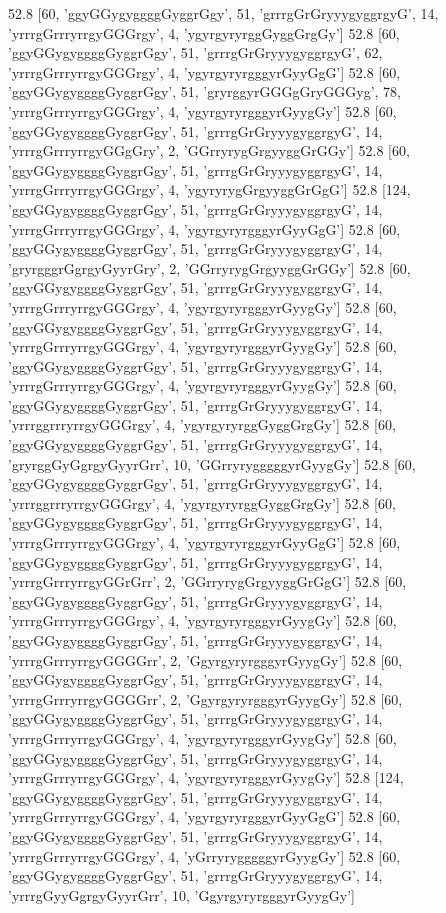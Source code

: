 52.8 [60, 'ggyGGygyggggGyggrGgy', 51, 'grrrgGrGryyygyggrgyG', 14, 'yrrrgGrrryrrgyGGGrgy', 4, 'ygyrgyryrggGyggGrgGy']
52.8 [60, 'ggyGGygyggggGyggrGgy', 51, 'grrrgGrGryyygyggrgyG', 62, 'yrrrgGrrryrrgyGGGrgy', 4, 'ygyrgyryrgggyrGyyGgG']
52.8 [60, 'ggyGGygyggggGyggrGgy', 51, 'gryrggyrGGGgGryGGGyg', 78, 'yrrrgGrrryrrgyGGGrgy', 4, 'ygyrgyryrgggyrGyygGy']
52.8 [60, 'ggyGGygyggggGyggrGgy', 51, 'grrrgGrGryyygyggrgyG', 14, 'yrrrgGrrryrrgyGGgGry', 2, 'GGrryrygGrgyyggGrGGy']
52.8 [60, 'ggyGGygyggggGyggrGgy', 51, 'grrrgGrGryyygyggrgyG', 14, 'yrrrgGrrryrrgyGGGrgy', 4, 'ygyryrygGrgyyggGrGgG']
52.8 [124, 'ggyGGygyggggGyggrGgy', 51, 'grrrgGrGryyygyggrgyG', 14, 'yrrrgGrrryrrgyGGGrgy', 4, 'ygyrgyryrgggyrGyyGgG']
52.8 [60, 'ggyGGygyggggGyggrGgy', 51, 'grrrgGrGryyygyggrgyG', 14, 'gryrgggrGgrgyGyyrGry', 2, 'GGrryrygGrgyyggGrGGy']
52.8 [60, 'ggyGGygyggggGyggrGgy', 51, 'grrrgGrGryyygyggrgyG', 14, 'yrrrgGrrryrrgyGGGrgy', 4, 'ygyrgyryrgggyrGyygGy']
52.8 [60, 'ggyGGygyggggGyggrGgy', 51, 'grrrgGrGryyygyggrgyG', 14, 'yrrrgGrrryrrgyGGGrgy', 4, 'ygyrgyryrgggyrGyygGy']
52.8 [60, 'ggyGGygyggggGyggrGgy', 51, 'grrrgGrGryyygyggrgyG', 14, 'yrrrgGrrryrrgyGGGrgy', 4, 'ygyrgyryrgggyrGyygGy']
52.8 [60, 'ggyGGygyggggGyggrGgy', 51, 'grrrgGrGryyygyggrgyG', 14, 'yrrrggrrryrrgyGGGrgy', 4, 'ygyrgyryrggGyggGrgGy']
52.8 [60, 'ggyGGygyggggGyggrGgy', 51, 'grrrgGrGryyygyggrgyG', 14, 'gryrggGyGgrgyGyyrGrr', 10, 'GGrryrygggggyrGyygGy']
52.8 [60, 'ggyGGygyggggGyggrGgy', 51, 'grrrgGrGryyygyggrgyG', 14, 'yrrrggrrryrrgyGGGrgy', 4, 'ygyrgyryrggGyggGrgGy']
52.8 [60, 'ggyGGygyggggGyggrGgy', 51, 'grrrgGrGryyygyggrgyG', 14, 'yrrrgGrrryrrgyGGGrgy', 4, 'ygyrgyryrgggyrGyyGgG']
52.8 [60, 'ggyGGygyggggGyggrGgy', 51, 'grrrgGrGryyygyggrgyG', 14, 'yrrrgGrrryrrgyGGrGrr', 2, 'GGrryrygGrgyyggGrGgG']
52.8 [60, 'ggyGGygyggggGyggrGgy', 51, 'grrrgGrGryyygyggrgyG', 14, 'yrrrgGrrryrrgyGGGrgy', 4, 'ygyrgyryrgggyrGyygGy']
52.8 [60, 'ggyGGygyggggGyggrGgy', 51, 'grrrgGrGryyygyggrgyG', 14, 'yrrrgGrrryrrgyGGGGrr', 2, 'GgyrgyryrgggyrGyygGy']
52.8 [60, 'ggyGGygyggggGyggrGgy', 51, 'grrrgGrGryyygyggrgyG', 14, 'yrrrgGrrryrrgyGGGGrr', 2, 'GgyrgyryrgggyrGyygGy']
52.8 [60, 'ggyGGygyggggGyggrGgy', 51, 'grrrgGrGryyygyggrgyG', 14, 'yrrrgGrrryrrgyGGGrgy', 4, 'ygyrgyryrgggyrGyygGy']
52.8 [60, 'ggyGGygyggggGyggrGgy', 51, 'grrrgGrGryyygyggrgyG', 14, 'yrrrgGrrryrrgyGGGrgy', 4, 'ygyrgyryrgggyrGyygGy']
52.8 [124, 'ggyGGygyggggGyggrGgy', 51, 'grrrgGrGryyygyggrgyG', 14, 'yrrrgGrrryrrgyGGGrgy', 4, 'ygyrgyryrgggyrGyyGgG']
52.8 [60, 'ggyGGygyggggGyggrGgy', 51, 'grrrgGrGryyygyggrgyG', 14, 'yrrrgGrrryrrgyGGGrgy', 4, 'yGrryrygggggyrGyygGy']
52.8 [60, 'ggyGGygyggggGyggrGgy', 51, 'grrrgGrGryyygyggrgyG', 14, 'yrrrgGyyGgrgyGyyrGrr', 10, 'GgyrgyryrgggyrGyygGy']
